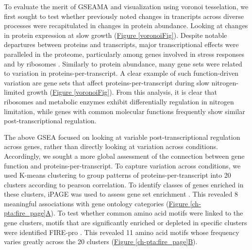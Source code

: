 To evaluate the merit of GSEAMA and visualization using voronoi tesselation, we first sought to test whether previously noted changes in trancripts across diverse processes were recapitulated in changes in protein abundance. Looking at changes in protein expression at slow growth (\hyperref[voronoiFig]{Figure \ref{voronoiFig}}). Despite notable departures between proteins and transcripts, major transcriptional effects were paralleled in the proteome, particularly among genes involved in stress responses and by ribosomes \cite{Brauer:2008jn}. Similarly to protein abundance, many gene sets were related to variation in proteins-per-transcript. A clear example of such function-driven variation are gene sets that affect proteins-per-transcript during slow nitrogen-limited growth (\hyperref[voronoiFig]{Figure \ref{voronoiFig}}). From this analysis, it is clear that ribosomes and metabolic enzymes exhibit differentially regulation in nitrogen limitation, while genes with common molecular functions frequently show similar post-transcriptional regulation.

The above GSEA focused on looking at variable post-transcriptional regulation across genes, rather than directly looking at variation across conditions. Accordingly, we sought a more global assessment of the connection between gene function and proteins-per-transcript. To capture variation across conditions, we used K-means clustering to group patterns of proteins-per-transcript into 20 clusters according to pearson correlation.  To identify classes of genes enriched in these clusters, iPAGE was used to assess gene set enrichment \cite{Goodarzi:2009cf}. This revealed 8 meaningful associations with gene ontology categories (\hyperref[ch-pta:fire_page]{Figure \ref{ch-pta:fire_page}A}). To test whether common amino acid motifs were linked to the gene clusters, motifs that are significantly enriched or depleted in specific clusters were identified FIRE-pro \cite{Lieber:2010fr}. This revealed 11 amino acid motifs whose frequency varies greatly across the 20 clusters (\hyperref[ch-pta:fire_page]{Figure \ref{ch-pta:fire_page}B}).


